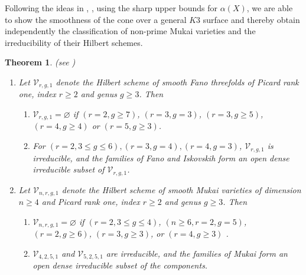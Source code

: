 \documentclass[11pt,twoside]{amsart}
\theoremstyle{plain}
\numberwithin{equation}{section}
\newtheorem{theorem}{Theorem}[section]
\theoremstyle{definition}
\begin{document}
Following the ideas in \cite{CLM93}, \cite{CLM98}, using the sharp upper bounds for $\alpha(X)$, we are able to show the smoothness of the cone over a general $K3$ surface and thereby obtain independently the classification of non-prime Mukai varieties and the irreducibility of their Hilbert schemes.

\begin{theorem}(see )\label{classification of mukai varieties intro}
\begin{enumerate}
    \item Let $\mathcal{V}_{r,g,1}$ denote the Hilbert scheme of smooth Fano threefolds of Picard rank one, index $r \geq 2$ and genus $g \geq 3$. Then

\begin{enumerate}
    \item $\mathcal{V}_{r,g,1} = \varnothing$ if $(r = 2, g \geq 7)$, $(r = 3, g = 3)$, $(r = 3, g \geq 5)$, $(r = 4, g \geq 4)$ or $(r = 5, g \geq 3)$. 
    \item For $(r = 2, 3 \leq g \leq 6), (r = 3, g = 4), (r = 4, g = 3)$, $\mathcal{V}_{r,g,1}$ is irreducible, and the families of Fano and Iskovskih form an open dense irreducible subset of $\mathcal{V}_{r,g,1}$.
\end{enumerate}

\item Let $\mathcal{V}_{n,r,g,1}$ denote the Hilbert scheme of smooth Mukai varieties of dimension $n \geq 4$ and Picard rank one, index $r \geq 2$ and genus $g \geq 3$. Then 
\begin{enumerate}
    \item $\mathcal{V}_{n,r,g,1} = \varnothing$ if $(r = 2, 3 \leq g \leq 4)$, $(n \geq 6, r = 2, g = 5)$, $(r = 2, g \geq 6)$, $(r = 3, g \geq 3)$, or $(r = 4, g \geq 3)$ . 
    \item $\mathcal{V}_{4,2,5,1}$ and $\mathcal{V}_{5,2,5,1}$ are irreducible, and the families of Mukai form an open dense irreducible subset of the components.
\end{enumerate}

\end{enumerate} 

\end{theorem}
\end{document}
